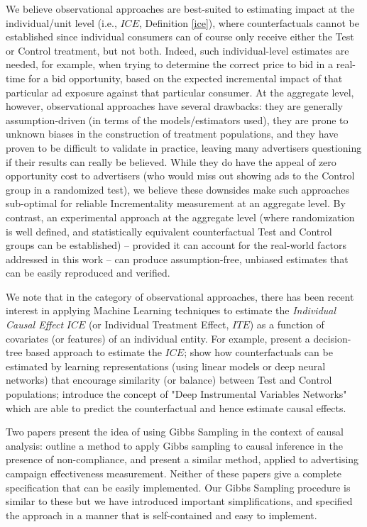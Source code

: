 \documentclass[11pt,a4paper]{article}
\theoremstyle{definition}
\theoremstyle{remark}
\theoremstyle{definition}
\theoremstyle{definition}
\theoremstyle{definition}
\theoremstyle{definition}
\theoremstyle{definition}
\theoremstyle{definition}
\begin{document}
We believe observational  approaches are best-suited to estimating impact at the individual/unit level (i.e., $ICE$, Definition \ref{ice}), where counterfactuals cannot be established since individual consumers can of course only receive either the Test or Control treatment, but not both. Indeed, such individual-level estimates are needed, for example, when trying to determine the correct price to bid in a real-time for a bid opportunity, based on the expected incremental impact of that particular ad exposure against that particular consumer. At the aggregate level, however, observational approaches have several drawbacks: they are generally assumption-driven (in terms of the models/estimators used), they are prone to unknown biases in the construction of treatment populations, and they have proven to be difficult to validate in practice, leaving many advertisers questioning if their results can really be believed. While they do have the appeal of zero opportunity cost to advertisers (who would miss out showing ads to the Control group in a randomized test), we believe these downsides make such approaches sub-optimal for reliable Incrementality measurement at an aggregate level. By contrast, an experimental approach at the aggregate level (where randomization is well defined, and statistically equivalent counterfactual Test and Control groups can be established) -- provided it can account for the real-world factors addressed in this work -- can produce assumption-free, unbiased estimates that can be easily reproduced and verified.

 We note that in the category of observational approaches, there has been recent interest in applying Machine Learning techniques to estimate the \textit{Individual Causal Effect} $ICE$ (or Individual Treatment Effect, $ITE$) as a function of covariates (or features) of an individual entity. For example, \cite{athey2016recursive, Athey2015} present a decision-tree based approach to estimate the $ICE$; \cite{johansson2016learning} show how counterfactuals can be estimated by learning representations (using linear models or deep neural networks) that encourage similarity (or balance) between Test and Control populations; \cite{hartford2016counterfactual} introduce the concept of "Deep Instrumental Variables Networks" which are able to predict the counterfactual and hence estimate causal effects.



Two papers present the idea of using Gibbs Sampling in the context of causal analysis: \cite{Chickering1996} outline a method to apply Gibbs sampling to causal inference in the presence of non-compliance, and \cite{Barajas2012} present a similar method, applied to advertising campaign effectiveness measurement. Neither of these papers give a complete specification that can be easily implemented. Our Gibbs Sampling procedure is similar to these but we have introduced important simplifications, and specified the approach in a manner that is self-contained and easy to implement.
\end{document}
